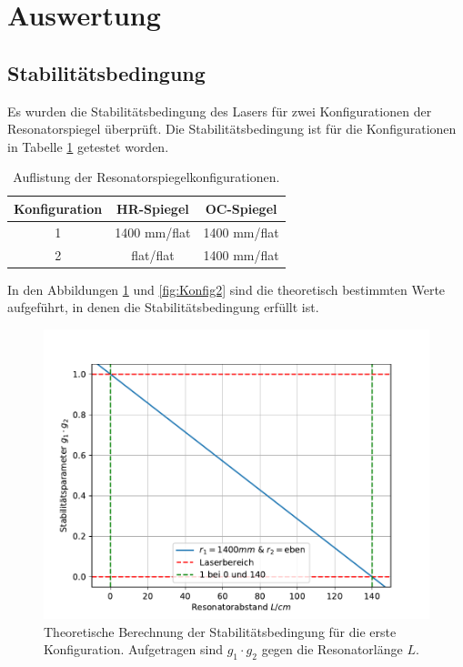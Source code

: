 \section{Auswertung}
\label{sec:Auswertung}
\subsection{Stabilitätsbedingung}
Es wurden die Stabilitätsbedingung des Lasers für zwei
Konfigurationen der Resonatorspiegel überprüft.
Die Stabilitätsbedingung  ist für die Konfigurationen in
Tabelle \ref{tab:Konfig} getestet worden.
\begin{table}[H]
    \centering
    \caption{Auflistung der Resonatorspiegelkonfigurationen.}
    \label{tab:Konfig}
    \begin{tabular}{c|c|c|}
        \toprule
        Konfiguration & HR-Spiegel & OC-Spiegel \\
        \midrule
        1 & 1400 mm/flat &1400 mm/flat\\
        2&  flat/flat & 1400 mm/flat\\
        \bottomrule
    \end{tabular}
\end{table}
In den Abbildungen \ref{fig:Konfig1} und \ref{fig:Konfig2} sind die theoretisch bestimmten
Werte aufgeführt, in denen die Stabilitätsbedingung erfüllt ist.
\begin{figure}[H]
  \centering
  \includegraphics{plots/Vorbereitungsplot2.pdf}
  \caption{Theoretische Berechnung der Stabilitätsbedingung für die erste
Konfiguration. Aufgetragen sind $g_1 \cdot g_2$ gegen die Resonatorlänge $L$.}
  \label{fig:Konfig1}
\end{figure}

